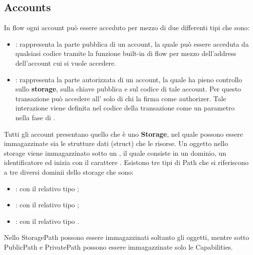 \subsection{Accounts}
In flow ogni account può essere acceduto per mezzo di due differenti tipi che sono:
\begin{itemize}
    \item {}: rappresenta la parte pubblica di un account, la quale può essere acceduta da qualsiasi codice tramite la funzione built-in di flow  per mezzo dell'address dell'account cui si vuole accedere.
    \item {}: rappresenta la parte autorizzata di un account, la quale ha pieno controllo sullo \textbf{storage}, sulla chiave pubblica e sul codice di tale account. Per questo transazione può accedere all' solo di chi la firma come authorizer. Tale interazione viene definita nel codice della transazione come un parametro nella fase di .
\end{itemize}
Tutti gli account presentano quello che è uno \textbf{Storage}, nel quale possono essere immagazzinate sia le strutture dati (struct) che le risorse. Un oggetto nello storage viene immagazzinato sotto un , il quale consiste in un dominio, un identificatore ed inizia con il carattere \codeinline{/}. Esistono tre tipi di Path che si riferiscono a tre diversi dominii dello storage che sono:
\begin{itemize}
    \item {}: con il relativo tipo ;
    \item {}: con il relativo tipo ;
    \item {}: con il relativo tipo .
\end{itemize}
Nello StoragePath possono essere immagazzinati soltanto gli oggetti, mentre sotto PublicPath e PrivatePath possono essere immagazzinate solo le Capabilities. 

